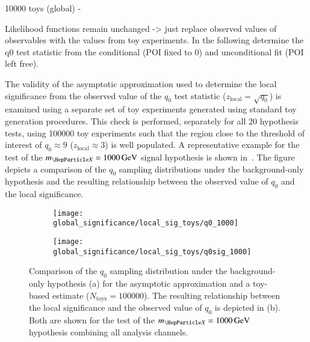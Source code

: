 10000 toys (global) -

Likelihood functions remain unchanged -> just replace observed values
of observables with the values from toy experiments. In the following
determine the q0 test statistic from the conditional (POI fixed to 0)
and unconditional fit (POI left free).


The validity of the asymptotic approximation used to determine the
local significance from the observed value of the $q_0$ test statistic
($z_{\text{local}} = \sqrt{q_0}$) is examined using a separate set of
toy experiments generated using standard toy generation
procedures. This check is performed, separately for all 20 hypothesis
tests, using \num{100000} toy experiments such that the region close
to the threshold of interest of $q_0 \approx 9$
($z_{\text{local}} \approx 3$) is well populated. A representative
example for the test of the $\mX = \SI{1000}{\GeV}$ signal hypothesis
is shown in~. The figure depicts a
comparison of the $q_0$ sampling distributions under the
background-only hypothesis and the resulting relationship between the
observed value of $q_0$ and the local significance.

\begin{figure}[htbp]
  \centering

  \begin{subfigure}{0.485\textwidth}
    \centering

    \texttt{[image: global\_significance/local\_sig\_toys/q0\_1000]}
    \subcaption{}
  \end{subfigure}\hfill%
  \begin{subfigure}{0.485\textwidth}
    \centering
    \texttt{[image: global\_significance/local\_sig\_toys/q0sig\_1000]}
    \subcaption{}%
    \label{fig:q0_samplingdist_q0sig}
  \end{subfigure}

  \caption{Comparison of the $q_0$ sampling distribution under the
    background-only hypothesis (a) for the asymptotic approximation
    and a toy-based estimate ($N_{\text{toys}} = \num{100000}$). The
    resulting relationship between the local significance and the
    observed value of $q_0$ is depicted in (b). Both are shown for the
    test of the $\mX = \SI{1000}{\GeV}$ hypothesis combining all
    analysis channels.}%
  \label{fig:q0_samplingdist}
\end{figure}

